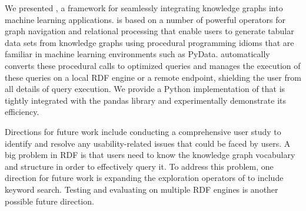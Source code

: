 

We presented \rdfframes, a framework for seamlessly integrating knowledge graphs into machine learning applications.
\rdfframes is based on a number of powerful operators for graph navigation and relational processing that enable users to generate tabular data sets from knowledge graphs using 
procedural programming idioms
that are familiar in machine learning environments such as PyData.
\rdfframes automatically converts these procedural calls to optimized \sparql queries and manages the execution of these queries on a local RDF engine or a remote \sparql endpoint,
shielding the user from all details of \sparql query execution.
We provide a Python implementation of \rdfframes that is tightly integrated with the pandas library
and experimentally demonstrate its efficiency.

Directions for future work include conducting a comprehensive user study to identify and resolve any usability-related issues that could be faced by \rdfframes users. 
A big problem in RDF is that users need to know the knowledge graph vocabulary and structure in order to effectively query it. To address this problem, one direction for future work is expanding the exploration operators of \rdfframes to include keyword search.
Testing and evaluating \rdfframes on multiple RDF engines is another possible future direction.
